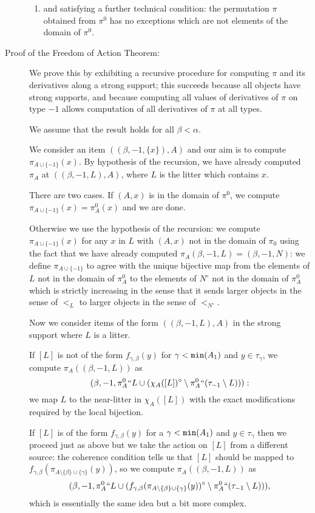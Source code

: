 \documentclass[112pt]{article}
\begin{document}
\begin{description}
\begin{enumerate}
\item and satisfying a further technical condition:    the permutation $\pi$ obtained from $\pi^0$ has no exceptions which are not elements of the domain of $\pi^0$.

\end{enumerate}

\item[Proof of the Freedom of Action Theorem:]  We prove this by exhibiting a recursive procedure for computing $\pi$ and its derivatives along a strong support;  this succeeds because all objects have
strong supports, and because computing all values of derivatives of $\pi$ on type $-1$ allows computation of all derivatives of $\pi$ at all types.

We assume that the result holds for all $\beta<\alpha$.

We consider an item $((\beta,-1,\{x\}),A)$ and our aim is to compute $\pi_{A \cup \{-1\}}(x)$.  By hypothesis of the recursion, we have already
computed $\pi_A$ at $((\beta,-1,L),A)$, where $L$ is the litter which contains $x$.

There are two cases.  If $(A,x)$ is in the domain of $\pi^0$, we compute $\pi_{A \cup \{-1\}}(x) = \pi^0_A(x)$ and we are done.

Otherwise we use the hypothesis of the recursion:  we compute $\pi_{A \cup \{-1\}}(x)$ for any $x$ in $L$ with $(A,x)$ not in the domain of $\pi_0$ using the fact that we have already computed $\pi_A(\beta,-1,L) = (\beta,-1,N)$:  we define $\pi_{A \cup \{-1\}}$ to agree with the unique bijective map from the
elements of $L$ not in the domain of $\pi^0_A$ to the elements of $N^{\circ}$ not in the domain of $\pi^0_A$ which is strictly increasing in the sense that it sends larger objects in the sense of $<_L$ to larger objects in the sense of $<_{N^{\circ}}$.

Now we consider items of the form $((\beta,-1,L),A)$ in the strong support where $L$ is a litter.

If $[L]$ is not of the form $f_{\gamma,\beta}(y)$ for $\gamma<{\tt min}(A_1)$ and $y \in \tau_\gamma$,
we compute $\pi_A((\beta,-1,L))$ as $$(\beta,-1,\pi^0_A``L \cup (\chi_A([L])^\circ \setminus \pi^0_A``(\tau_{-1} \setminus L))):$$ we map
$L$ to the near-litter in $\chi_A([L])$ with the exact modifications required by the local bijection.

If $[L]$ is of the form $f_{\gamma,\beta}(y)$ for a $\gamma<{\tt min}(A_1)$ and $y \in \tau_\gamma$ then we proceed just as above but we take the action on $[L]$ from a different source:
the coherence condition tells us that $[L]$ should be mapped to $f_{\gamma,\beta}(\pi_{A \setminus \{\beta\} \cup \{\gamma\}}(y))$, so we compute
$\pi_A((\beta,-1,L))$ as $$(\beta,-1,\pi^0_A``L \cup (f_{\gamma,\beta}(\pi_{A \setminus \{\beta\} \cup \{\gamma\}}(y))^\circ \setminus \pi^0_A``(\tau_{-1}\setminus L))),$$  which is essentially the same idea but a bit more complex.


\end{description}
\end{document}
